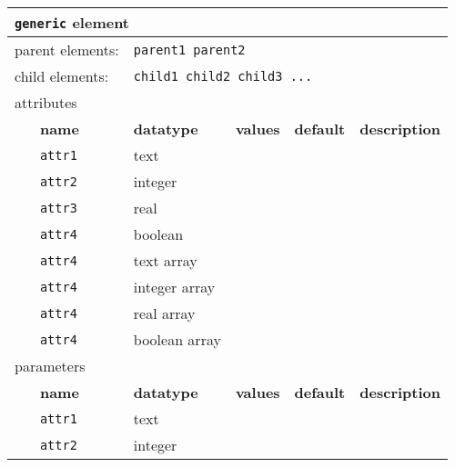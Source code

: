 \begin{table}[h]
\begin{center}
\begin{tabularx}{\textwidth}{l l l l l l }
\hline
\multicolumn{6}{l}{\texttt{generic} element} \\
\hline
\multicolumn{2}{l}{parent elements:} & \multicolumn{4}{l}{\texttt{parent1 parent2}}\\
\multicolumn{2}{l}{child  elements:} & \multicolumn{4}{l}{\texttt{child1 child2 child3 ...}}\\
\multicolumn{2}{l}{attributes}  & \multicolumn{4}{l}{}\\
   &   \bfseries name     & \bfseries datatype & \bfseries values & \bfseries default   & \bfseries description \\
   &   \texttt{attr1}     &  text              &                  &                     &                       \\
   &   \texttt{attr2}     &  integer           &                  &                     &                       \\
   &   \texttt{attr3}     &  real              &                  &                     &                       \\
   &   \texttt{attr4}     &  boolean           &                  &                     &                       \\
   &   \texttt{attr4}     &  text array        &                  &                     &                       \\
   &   \texttt{attr4}     &  integer array     &                  &                     &                       \\
   &   \texttt{attr4}     &  real array        &                  &                     &                       \\
   &   \texttt{attr4}     &  boolean array     &                  &                     &                       \\
\multicolumn{2}{l}{parameters}  & \multicolumn{4}{l}{}\\
   &   \bfseries name     & \bfseries datatype & \bfseries values & \bfseries default   & \bfseries description \\
   &   \texttt{attr1}     &  text              &                  &                     &                       \\
   &   \texttt{attr2}     &  integer           &                  &                     &                       \\

\end{tabularx}
\end{center}
\end{table}
